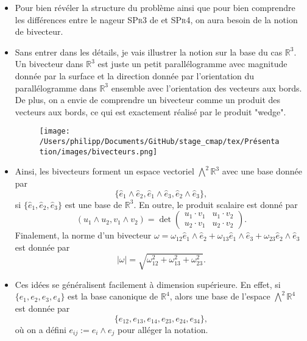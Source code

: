 \documentclass[12pt,a4paper]{article}
\theoremstyle{plain}
\theoremstyle{plain}
\theoremstyle{plain}
\theoremstyle{definition}
\theoremstyle{definition}
\theoremstyle{definition}
\theoremstyle{plain}
\newcommand{\R}{\mathbb{R}}
\begin{document}
\begin{itemize}
\item Pour bien révéler la structure du problème ainsi que pour bien comprendre les différences entre le nageur \textsc{SPr3} de \cite{Alouges2017} et \textsc{SPr4}, on aura besoin de la notion de bivecteur.

\item Sans entrer dans les détails, je vais illustrer la notion sur la base du cas $\R^3$. Un bivecteur dans $\R^3$ est juste un petit parallélogramme avec magnitude donnée par la surface et la direction donnée par l'orientation du parallélogramme dans $\R^3$ ensemble avec l'orientation des vecteurs aux bords. De plus, on a envie de comprendre un bivecteur comme un produit des vecteurs aux bords, ce qui est exactement réalisé par le produit "wedge".

\begin{figure}[h]
\center
\texttt{[image: /Users/philipp/Documents/GitHub/stage\_cmap/tex/Présentation/images/bivecteurs.png]}
\end{figure}

\item Ainsi, les bivecteurs forment un espace vectoriel $\bigwedge^2 \R^3$ avec une base donnée par
\begin{equation}
 \{\hat{e}_1 \wedge \hat{e}_2, \hat{e}_1 \wedge \hat{e}_3, \hat{e}_2 \wedge \hat{e}_3\},
\end{equation}
si $\{\hat{e}_1, \hat{e}_2, \hat{e}_3\}$ est une base de $\R^3$. En outre, le produit scalaire est donné par
\begin{equation}
( u_1 \wedge u_2 , v_1 \wedge v_2 ) = \det \left (\begin{array}{cc}
u_1 \cdot v_1 & u_1 \cdot v_2 \\ 
u_2 \cdot v_1 & u_2 \cdot v_2
\end{array}  \right).
\end{equation}
Finalement, la norme d'un bivecteur $\omega = \omega_{12} \hat{e}_1 \wedge \hat{e}_2 + \omega_{13} \hat{e}_1 \wedge \hat{e}_3 + \omega_{23} \hat{e}_2 \wedge \hat{e}_3$ est donnée par
\begin{equation}
|\omega| = \sqrt{\omega_{12}^2 + \omega_{13}^2 + \omega_{23}^2}.
\end{equation}

\item Ces idées se généralisent facilement à dimension supérieure. En effet, si $\{e_1, e_2, e_3, e_4\}$ est la base canonique de $\R^4$, alors une base de l'espace $\bigwedge^2 \R^4$ est donnée par
\begin{equation}
\{e_{12}, e_{13}, e_{14}, e_{23}, e_{24}, e_{34}\},
\end{equation}
où on a défini $e_{ij} := e_i \wedge e_j$ pour alléger la notation.


\end{itemize}
\end{document}
